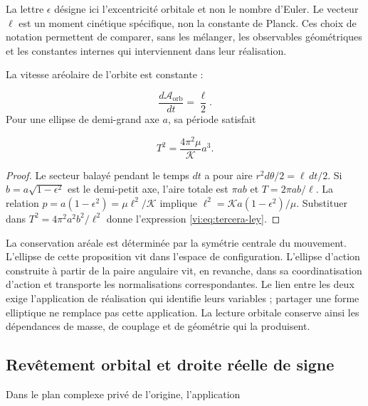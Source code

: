 La lettre $\epsilon$ désigne ici l’excentricité orbitale et
non le nombre d’Euler. Le vecteur $\boldsymbol\ell$ est un
moment cinétique spécifique, non la constante de Planck.
Ces choix de notation permettent de comparer, sans les mélanger,
les observables géométriques et les constantes internes qui
interviennent dans leur réalisation.


\begin{proposition}
\label{vi:prop:ley-areal}
La vitesse aréolaire de l’orbite est constante :

\begin{equation}
 \frac{d\mathcal A_{\mathrm{orb}}}{dt}=\frac\ell2.
 \label{vi:eq:ley-areal}
\end{equation}
Pour une ellipse de demi-grand axe $a$, sa période satisfait

\begin{equation}
 T^2=\frac{4\pi^2\mu}{\mathcal K}a^3.
 \label{vi:eq:tercera-ley}
\end{equation}
\end{proposition}
\begin{proof}
Le secteur balayé pendant le temps $dt$ a pour aire
$r^2d\theta/2=\ell\,dt/2$. Si $b=a\sqrt{1-\epsilon^2}$
est le demi-petit axe, l’aire totale est $\pi ab$ et
$T=2\pi ab/\ell$. La relation
$p=a(1-\epsilon^2)=\mu\ell^2/\mathcal K$ implique
$\ell^2=\mathcal K a(1-\epsilon^2)/\mu$.
Substituer dans $T^2=4\pi^2a^2b^2/\ell^2$ donne l’expression
\eqref{vi:eq:tercera-ley}.

\end{proof}

La conservation aréale est déterminée par la symétrie centrale
du mouvement. L’ellipse de cette proposition vit dans
l’espace de configuration. L’ellipse d’action construite
à partir de la paire angulaire vit, en revanche, dans sa coordinatisation d’action
et transporte les normalisations correspondantes. Le lien
entre les deux exige l’application de réalisation qui identifie leurs
variables ; partager une forme elliptique ne remplace pas cette application.
La lecture orbitale conserve ainsi les dépendances de masse,
de couplage et de géométrie qui la produisent.


\subsection{Revêtement orbital et droite réelle de signe
}
\label{vi:subsec:cubierta-orbital}

Dans le plan complexe privé de l’origine, l’application

